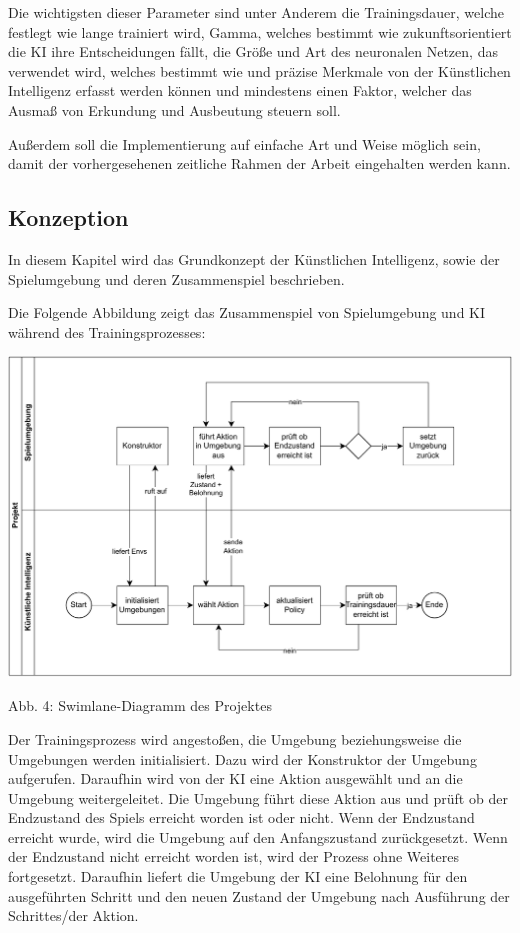 Die wichtigsten dieser Parameter sind unter Anderem die Trainingsdauer, welche festlegt wie lange trainiert wird, Gamma, welches bestimmt wie zukunftsorientiert die KI ihre Entscheidungen fällt, die Größe und Art des neuronalen Netzen, das verwendet wird, welches bestimmt wie und präzise Merkmale von der Künstlichen Intelligenz erfasst werden können und mindestens einen Faktor, welcher das Ausmaß von Erkundung und Ausbeutung steuern soll. 

Außerdem soll die Implementierung auf einfache Art und Weise möglich sein, damit der vorhergesehenen zeitliche Rahmen der Arbeit eingehalten werden kann.
\subsection{Konzeption}
In diesem Kapitel wird das Grundkonzept der Künstlichen Intelligenz, sowie der Spielumgebung und deren Zusammenspiel beschrieben.

\begin{minipage}{\linewidth}
	Die Folgende Abbildung zeigt das Zusammenspiel von Spielumgebung und KI während des Trainingsprozesses:
	
	\vspace{0.5cm}
	\includegraphics[width=1\textwidth]{Bilder/swimlane.drawio.pdf} 
	
	Abb. 4: Swimlane-Diagramm des Projektes \\

\end{minipage}

Der Trainingsprozess wird angestoßen, die Umgebung beziehungsweise die Umgebungen werden initialisiert. Dazu wird der Konstruktor der Umgebung aufgerufen. Daraufhin wird von der KI eine Aktion ausgewählt und an die Umgebung weitergeleitet. Die Umgebung führt diese Aktion aus und prüft ob der Endzustand des Spiels erreicht worden ist oder nicht. Wenn der Endzustand erreicht wurde, wird die Umgebung auf den Anfangszustand zurückgesetzt. Wenn der Endzustand nicht erreicht worden ist, wird der Prozess ohne Weiteres fortgesetzt. Daraufhin liefert die Umgebung der KI eine Belohnung für den ausgeführten Schritt und den neuen Zustand der Umgebung nach Ausführung der Schrittes/der Aktion.

